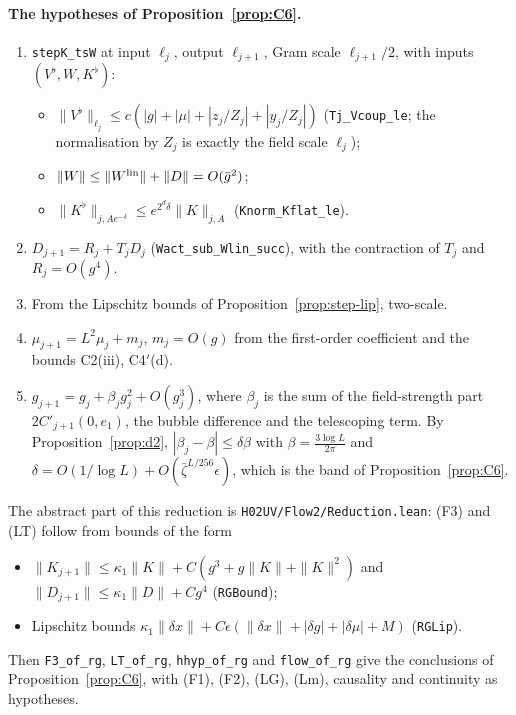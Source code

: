\documentclass[11pt]{amsart}
\theoremstyle{definition}
\theoremstyle{remark}
\numberwithin{equation}{section}
\begin{document}
\paragraph{The hypotheses of Proposition~\ref{prop:C6}.}
\begin{enumerate}
\item[(F3), $K$.] \texttt{stepK\_tsW} at input $\ell_j$, output $\ell_{j+1}$, Gram scale $\ell_{j+1}/2$,
  with inputs $(V^\flat,W,K^\flat)$:
  \begin{itemize}
  \item $\|V^\flat\|_{\ell_j}\le c(|g|+|\mu|+|z_j/Z_j|+|y_j/Z_j|)$ (\texttt{Tj\_Vcoup\_le}; the
    normalisation by $Z_j$ is exactly the field scale $\ell_j$);
  \item $\|W\|\le\|W^{\rm lin}\|+\|D\|=O(\bar g^2)$;
  \item $\|K^\flat\|_{j,Ae^{-\delta}}\le e^{2^d\delta}\|K\|_{j,A}$ (\texttt{Knorm\_Kflat\_le}).
  \end{itemize}
\item[(F3), $D$.] $D_{j+1}=R_j+T_jD_j$ (\texttt{Wact\_sub\_Wlin\_succ}), with the contraction of $T_j$
  and $R_j=O(g^4)$.
\item[(LT).] From the Lipschitz bounds of Proposition~\ref{prop:step-lip}, two-scale.
\item[(F2), (Lm).] $\mu_{j+1}=L^2\mu_j+m_j$, $m_j=O(g)$ from the first-order coefficient and the
  bounds C2(iii), C4$'$(d).
\item[(F1), (LG).] $g_{j+1}=g_j+\beta_jg_j^2+O(g_j^3)$, where $\beta_j$ is the sum of the field-strength
  part $2C'_{j+1}(0,e_1)$, the bubble difference and the telescoping term. By
  Proposition~\ref{prop:d2}, $|\beta_j-\beta|\le\delta\beta$ with $\beta=\frac{3\log L}{2\pi}$ and
  $\delta=O(1/\log L)+O(\bar\zeta^{L/256}\epsilon)$, which is the band of Proposition~\ref{prop:C6}.
\end{enumerate}
The abstract part of this reduction is \texttt{H02UV/Flow2/Reduction.lean}: (F3) and (LT) follow from
bounds of the form
\begin{itemize}
\item $\|K_{j+1}\|\le\kappa_1\|K\|+C(g^3+g\|K\|+\|K\|^2)$ and $\|D_{j+1}\|\le\kappa_1\|D\|+Cg^4$
  (\texttt{RGBound});
\item Lipschitz bounds $\kappa_1\|\delta x\|+C\epsilon(\|\delta x\|+|\delta g|+|\delta\mu|+M)$ (\texttt{RGLip}).
\end{itemize}
Then \texttt{F3\_of\_rg}, \texttt{LT\_of\_rg}, \texttt{hhyp\_of\_rg} and \texttt{flow\_of\_rg} give the
conclusions of Proposition~\ref{prop:C6}, with (F1), (F2), (LG), (Lm), causality and continuity as
hypotheses.
\end{document}
